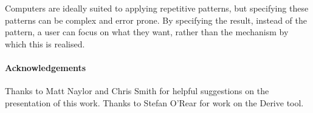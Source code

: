 \documentclass{llncs}
\begin{document}
Computers are ideally suited to applying repetitive patterns, but specifying these patterns can be complex and error prone. By specifying the result, instead of the pattern, a user can focus on what they want, rather than the mechanism by which this is realised.

\paragraph{Acknowledgements}

Thanks to Matt Naylor and Chris Smith for helpful suggestions on the presentation of this work. Thanks to Stefan O'Rear for work on the Derive tool.



\end{document}
